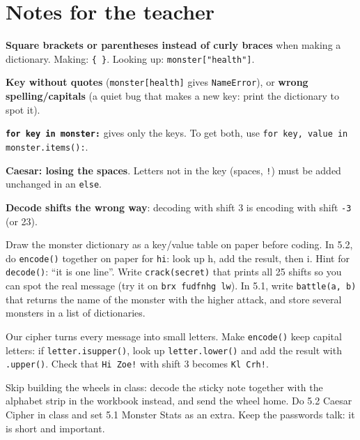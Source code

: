 \section{Notes for the teacher}
\begin{commonmistakes}
  \item \textbf{Square brackets or parentheses instead of curly braces} when making a dictionary. Making: \texttt{\{ \}}. Looking up: \texttt{monster["health"]}.
  \item \textbf{Key without quotes} (\texttt{monster[health]} gives \texttt{NameError}), or \textbf{wrong spelling/capitals} (a quiet bug that makes a new key: print the dictionary to spot it).
  \item \textbf{\texttt{for key in monster:}} gives only the keys. To get both, use \texttt{for key, value in monster.items():}.
  \item \textbf{Caesar: losing the spaces}. Letters not in the key (spaces, \texttt{!}) must be added unchanged in an \texttt{else}.
  \item \textbf{Decode shifts the wrong way}: decoding with shift 3 is encoding with shift \texttt{-3} (or 23).
\end{commonmistakes}

\begin{differentiation}
\supportpath Draw the monster dictionary as a key/value table on paper before coding. In 5.2, do \texttt{encode()} together on paper
for \texttt{hi}: look up h, add the result, then i. Hint for \texttt{decode()}: \enquote{it is one line}.
\extensionpath Write \texttt{crack(secret)} that prints all 25 shifts so you can spot the real message (try it on \texttt{brx fudfnhg lw}). In 5.1, write
\texttt{battle(a, b)} that returns the name of the monster with the higher attack, and store several monsters in a list of dictionaries.
\end{differentiation}

\begin{stretchchallenge}
Our cipher turns every message into small letters. Make \texttt{encode()} keep capital letters: if \texttt{letter.isupper()}, look up
\texttt{letter.lower()} and add the result with \texttt{.upper()}. Check that \texttt{Hi Zoe!} with shift 3 becomes \texttt{Kl Crh!}.
\end{stretchchallenge}

\begin{teachernote}
Skip building the wheels in class: decode the sticky note together with the alphabet strip in the workbook instead, and send the wheel home.
Do 5.2 Caesar Cipher in class and set 5.1 Monster Stats as an extra. Keep the passwords talk: it is short and important.
\end{teachernote}
